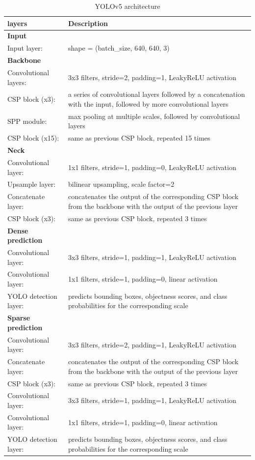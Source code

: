 \documentclass[12pt,oneside,openright,a4paper]{cpe-thai-project}
\begin{document}
\begin{table}[!h]
\centering
\caption{YOLOv5 architecture}\label{tbl:yoloarchitech}
\begin{tabular}{p{}>{\raggedright\arraybackslash}p{}}
\toprule
layers  & Description  \\ \midrule
\textbf{Input} & \\
\quad Input layer: & shape = (batch\_size, 640, 640, 3) \\ 
\textbf{Backbone} & \\
\quad Convolutional layers: & 3x3 filters, stride=2, padding=1, LeakyReLU activation \\
\quad  CSP block (x3): & a series of convolutional layers followed by a concatenation with the input, followed by more convolutional layers \\
\quad  SPP module: & max pooling at multiple scales, followed by convolutional layers \\
\quad  CSP block (x15): & same as previous CSP block, repeated 15 times \\  
\textbf{Neck} & \\
\quad Convolutional layer: & 1x1 filters, stride=1, padding=0, LeakyReLU activation \\
\quad  Upsample layer: & bilinear upsampling, scale factor=2 \\
\quad  Concatenate layer: & concatenates the output of the corresponding CSP block from the backbone with the output of the previous layer \\
\quad  CSP block (x3): & same as previous CSP block, repeated 3 times \\ 
\textbf{Dense prediction} & \\
\quad Convolutional layer: & 3x3 filters, stride=1, padding=1, LeakyReLU activation \\
\quad  Convolutional layer: & 1x1 filters, stride=1, padding=0, linear activation \\
\quad  YOLO detection layer: & predicts bounding boxes, objectness scores, and class probabilities for the corresponding scale \\ 
\textbf{Sparse prediction} & \\ 
\quad Convolutional layer: & 3x3 filters, stride=2, padding=1, LeakyReLU activation \\
\quad  Concatenate layer: & concatenates the output of the corresponding CSP block from the backbone with the output of the previous layer \\
\quad  CSP block (x3): & same as previous CSP block, repeated 3 times \\
\quad  Convolutional layer: & 3x3 filters, stride=1, padding=1, LeakyReLU activation \\
\quad  Convolutional layer: & 1x1 filters, stride=1, padding=0, linear activation \\
\quad  YOLO detection layer: & predicts bounding boxes, objectness scores, and class probabilities for the corresponding scale \\ \hline
\end{tabular}
\end{table}
\end{document}
